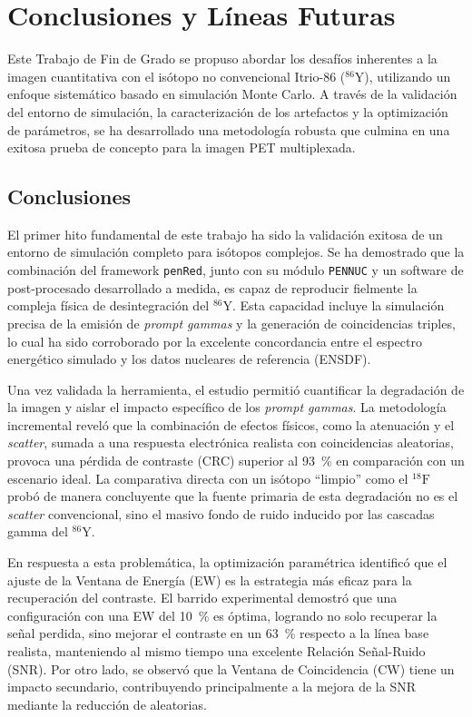 \chapter{Conclusiones y Líneas Futuras}
\label{cap:conclusiones}

Este Trabajo de Fin de Grado se propuso abordar los desafíos inherentes a la imagen cuantitativa con el isótopo no convencional Itrio-86 ($^{86}\text{Y}$), utilizando un enfoque sistemático basado en simulación Monte Carlo. A través de la validación del entorno de simulación, la caracterización de los artefactos y la optimización de parámetros, se ha desarrollado una metodología robusta que culmina en una exitosa prueba de concepto para la imagen PET multiplexada.

\section{Conclusiones}
\label{sec:conclusiones:conclusiones}

El primer hito fundamental de este trabajo ha sido la validación exitosa de un entorno de simulación completo para isótopos complejos. Se ha demostrado que la combinación del framework \texttt{penRed}, junto con su módulo \texttt{PENNUC} y un software de post-procesado desarrollado a medida, es capaz de reproducir fielmente la compleja física de desintegración del $^{86}\text{Y}$. Esta capacidad incluye la simulación precisa de la emisión de \textit{prompt gammas} y la generación de coincidencias triples, lo cual ha sido corroborado por la excelente concordancia entre el espectro energético simulado y los datos nucleares de referencia (ENSDF).

Una vez validada la herramienta, el estudio permitió cuantificar la degradación de la imagen y aislar el impacto específico de los \textit{prompt gammas}. La metodología incremental reveló que la combinación de efectos físicos, como la atenuación y el \textit{scatter}, sumada a una respuesta electrónica realista con coincidencias aleatorias, provoca una pérdida de contraste (CRC) superior al \SI{93}{\percent} en comparación con un escenario ideal. La comparativa directa con un isótopo \enquote{limpio} como el $^{18}\text{F}$ probó de manera concluyente que la fuente primaria de esta degradación no es el \textit{scatter} convencional, sino el masivo fondo de ruido inducido por las cascadas gamma del $^{86}\text{Y}$.

En respuesta a esta problemática, la optimización paramétrica identificó que el ajuste de la Ventana de Energía (EW) es la estrategia más eficaz para la recuperación del contraste. El barrido experimental demostró que una configuración con una EW del \SI{10}{\percent} es óptima, logrando no solo recuperar la señal perdida, sino mejorar el contraste en un \SI{63}{\percent} respecto a la línea base realista, manteniendo al mismo tiempo una excelente Relación Señal-Ruido (SNR). Por otro lado, se observó que la Ventana de Coincidencia (CW) tiene un impacto secundario, contribuyendo principalmente a la mejora de la SNR mediante la reducción de aleatorias.

